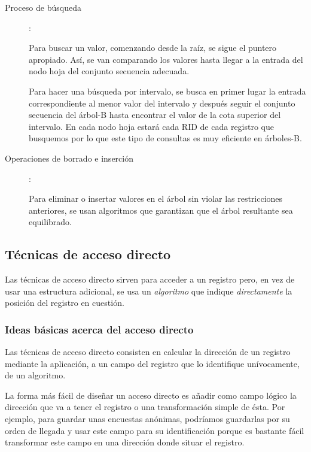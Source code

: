 \documentclass[10pt,a4paper,spanish]{report}
\begin{document}
\begin{description}
    \item[Proceso de búsqueda]:

    Para buscar un valor, comenzando desde la raíz, se sigue el puntero apropiado. Así, se van comparando los valores hasta llegar  a la entrada del nodo hoja del conjunto secuencia adecuada.

    Para hacer una búsqueda por intervalo, se busca en primer lugar la entrada correspondiente al menor valor del intervalo y después seguir el conjunto secuencia del árbol-B hasta encontrar el valor de la cota superior del intervalo. En cada nodo hoja estará cada RID de cada registro que busquemos por lo que este tipo de consultas es muy eficiente en árboles-B.

    

    \item[Operaciones de borrado e inserción]:

    Para eliminar o insertar valores en el árbol sin violar las restricciones anteriores, se usan algoritmos que garantizan que el árbol resultante sea equilibrado. 
\end{description}

\textcolor[rgb]{1,0.2,0.3}{\subsection{Técnicas de acceso directo}}
Las técnicas de acceso directo sirven para acceder a un registro pero, en vez de usar una estructura adicional, se usa un \textcolor[rgb]{1,0.2,0.3}{\textit{algoritmo}} que indique \textcolor[rgb]{1,0.2,0.3}{\textit{directamente}} la posición del registro en cuestión.

\textcolor[rgb]{1,0.2,0.3}{\subsubsection{Ideas básicas acerca del acceso directo}}
Las técnicas de acceso directo consisten en calcular la dirección de un registro mediante la aplicación, a un campo del registro que lo identifique unívocamente, de un algoritmo.

La forma más fácil de diseñar un acceso directo es añadir como campo lógico la dirección que va a tener el registro o una transformación simple de ésta. Por ejemplo, para guardar unas encuestas anónimas, podríamos guardarlas por su orden de llegada y usar este campo para su identificación porque es bastante fácil transformar este campo en una dirección donde situar el registro.
\end{document}
